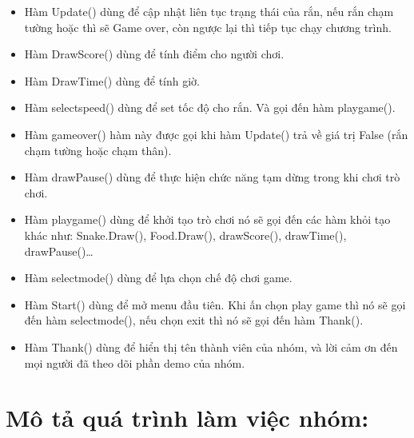 \documentclass{article}
\begin{document}
\begin{itemize}
\item Hàm Update() dùng để cập nhật liên tục trạng thái của rắn, nếu rắn chạm tường hoặc thì sẽ Game over, còn ngược lại thì tiếp tục chạy chương trình. 
\item Hàm DrawScore() dùng để tính điểm cho người chơi.
\item Hàm DrawTime() dùng để tính giờ. 
\item Hàm selectspeed() dùng để set tốc độ cho rắn. Và gọi đến hàm playgame().
\item Hàm gameover() hàm này được gọi khi hàm Update() trả về giá trị False (rắn chạm tường hoặc chạm thân).
\item Hàm drawPause() dùng để thực hiện chức năng tạm dừng trong khi chơi trò chơi.
\item Hàm playgame() dùng để khởi tạo trò chơi nó sẽ gọi đến các hàm khỏi tạo khác như: Snake.Draw(), Food.Draw(), drawScore(), drawTime(), drawPause()…
\item Hàm selectmode() dùng để lựa chọn chế độ chơi game.
\item Hàm Start() dùng để mở menu đầu tiên. Khi ấn chọn play game thì nó sẽ gọi đến hàm selectmode(), nếu chọn exit thì nó sẽ gọi đến hàm Thank().
\item Hàm Thank() dùng để hiển thị tên thành viên của nhóm, và lời cảm ơn đến mọi người đã theo dõi phần demo của nhóm.
\end{itemize}



\newpage
\section{Mô tả quá trình làm việc nhóm:}
\Large
\end{document}
